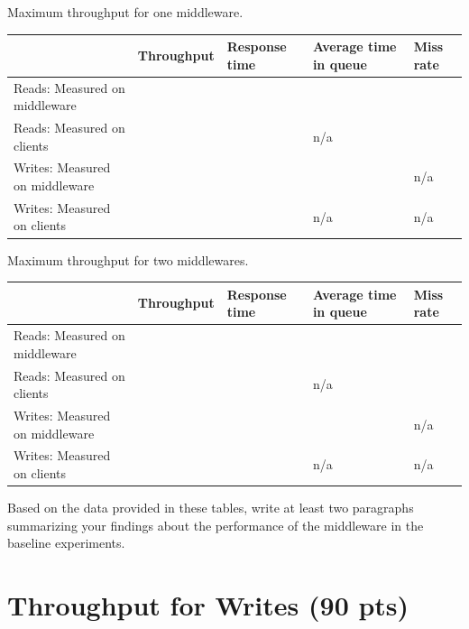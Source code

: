 \documentclass[11pt,a4paper]{article}
\begin{document}
\begin{center}
	{Maximum throughput for one middleware.}
	\begin{tabular}{|l|p{2cm}|p{2cm}|p{2cm}|p{2cm}|}
		\hline                                & Throughput & Response time & Average time in queue & Miss rate \\ 
		\hline Reads: Measured on middleware  &            &               &                       &           \\ 
		\hline Reads: Measured on clients     &            &               & n/a                   &           \\ 
		\hline Writes: Measured on middleware &            &               &                       & n/a       \\ 
		\hline Writes: Measured on clients    &            &               & n/a                   & n/a       \\ 
		\hline 
	\end{tabular}
\end{center}

\begin{center}
	{Maximum throughput for two middlewares.}
	\begin{tabular}{|l|p{2cm}|p{2cm}|p{2cm}|p{2cm}|}
		\hline                                & Throughput & Response time & Average time in queue & Miss rate \\ 
		\hline Reads: Measured on middleware  &            &               &                       &           \\ 
		\hline Reads: Measured on clients     &            &               & n/a                   &           \\ 
		\hline Writes: Measured on middleware &            &               &                       & n/a       \\ 
		\hline Writes: Measured on clients    &            &               & n/a                   & n/a       \\ 
		\hline 
	\end{tabular}
\end{center}

Based on the data provided in these tables, write at least two paragraphs summarizing your findings about the performance of the middleware in the baseline experiments.

\section{Throughput for Writes (90 pts)}
\end{document}
